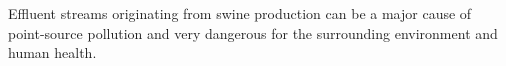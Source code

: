 Effluent streams originating from swine production can be a major cause of point-source pollution and very dangerous for the surrounding environment and human health.
